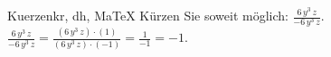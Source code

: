 \begin{MAufgabe}{Kuerzen}{kr, dh, MaTeX}
K\"urzen Sie soweit m\"oglich: $\frac{6\, y^3\, z}{- 6\, y^3\, z}$.\\ 
\ifLsg\MLoesung
\quad $\frac{6\, y^3\, z}{- 6\, y^3\, z}=\frac{(6\, y^3\, z)\cdot(1)}{(6\, y^3\, z)\cdot(-1)}=\frac{1}{-1}=-1$.\else\relax\fi
 \end{MAufgabe}